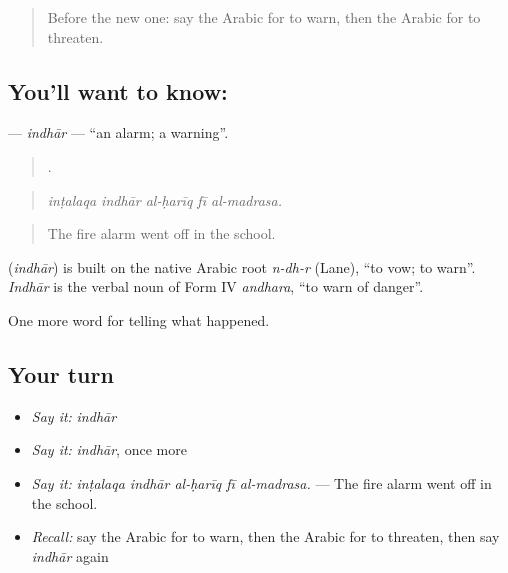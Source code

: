 \label{lesson:AR-C324-indhar}



\begin{quote}
Before the new one: say the Arabic for to warn, then the Arabic for to threaten.
\end{quote}

\subsection*{You'll want to know: }
\textbf{} — \emph{indhār} — \textquotedblleft{}an alarm; a warning\textquotedblright{}.

\begin{quote}
    .
\end{quote}

\begin{quote}
\emph{inṭalaqa indhār al-ḥarīq fī al-madrasa.}
\end{quote}

\begin{quote}
The fire alarm went off in the school.
\end{quote}

\begin{cousinweb}
\textbf{} (\emph{indhār}) is built on the native Arabic root \emph{n-dh-r} (Lane), \textquotedblleft{}to vow; to warn\textquotedblright{}. \emph{Indhār} is the verbal noun of Form IV \emph{andhara}, \textquotedblleft{}to warn of danger\textquotedblright{}.
\end{cousinweb}

\begin{grammarlens}[title={What you've built}]
One more word for telling what happened.
\end{grammarlens}

\subsection*{Your turn}
\begin{itemize}
\raggedright
  \item \emph{Say it:} \emph{indhār}
  \item \emph{Say it:} \emph{indhār}, once more
  \item \emph{Say it:} \emph{inṭalaqa indhār al-ḥarīq fī al-madrasa.} — The fire alarm went off in the school.
  \item \emph{Recall:} say the Arabic for to warn, then the Arabic for to threaten, then say \emph{indhār} again
\end{itemize}

